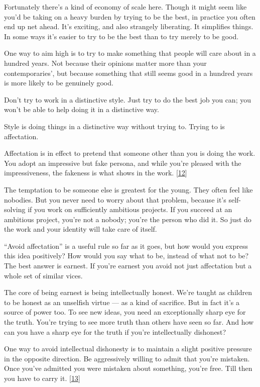 Fortunately there's a kind of economy of scale here. Though it might
seem like you'd be taking on a heavy burden by trying to be the best, in
practice you often end up net ahead. It's exciting, and also strangely
liberating. It simplifies things. In some ways it's easier to try to be
the best than to try merely to be good.

One way to aim high is to try to make something that people will care
about in a hundred years. Not because their opinions matter more than
your contemporaries', but because something that still seems good in a
hundred years is more likely to be genuinely good.

Don't try to work in a distinctive style. Just try to do the best job
you can; you won't be able to help doing it in a distinctive way.

Style is doing things in a distinctive way without trying to. Trying to
is affectation.

Affectation is in effect to pretend that someone other than you is doing
the work. You adopt an impressive but fake persona, and while you're
pleased with the impressiveness, the fakeness is what shows in the work.
{[}\hyperref[f12n]{12}{]}

The temptation to be someone else is greatest for the young. They often
feel like nobodies. But you never need to worry about that problem,
because it's self-solving if you work on sufficiently ambitious
projects. If you succeed at an ambitious project, you're not a nobody;
you're the person who did it. So just do the work and your identity will
take care of itself.

``Avoid affectation'' is a useful rule so far as it goes, but how would
you express this idea positively? How would you say what to be, instead
of what not to be? The best answer is earnest. If you're earnest you
avoid not just affectation but a whole set of similar vices.

The core of being earnest is being intellectually honest. We're taught
as children to be honest as an unselfish virtue --- as a kind of
sacrifice. But in fact it's a source of power too. To see new ideas, you
need an exceptionally sharp eye for the truth. You're trying to see more
truth than others have seen so far. And how can you have a sharp eye for
the truth if you're intellectually dishonest?

One way to avoid intellectual dishonesty is to maintain a slight
positive pressure in the opposite direction. Be aggressively willing to
admit that you're mistaken. Once you've admitted you were mistaken about
something, you're free. Till then you have to carry it.
{[}\hyperref[f13n]{13}{]}

